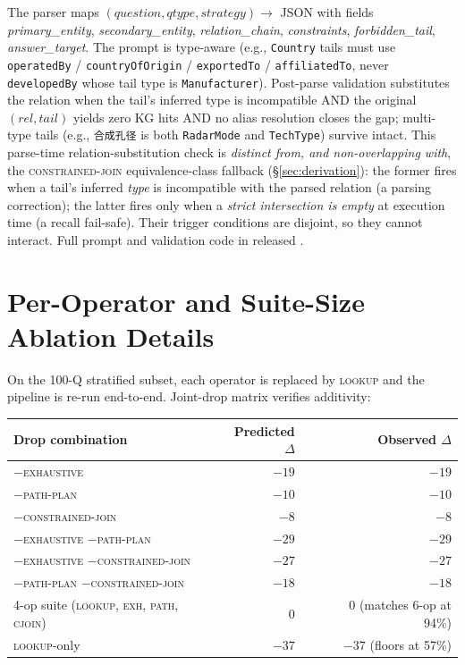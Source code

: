 \documentclass[11pt,a4paper]{article}
\newcommand{\op}[1]{\textsc{\small #1}}
\begin{document}
The parser maps $(\textit{question}, \textit{qtype}, \textit{strategy}) \to$ JSON with fields \textit{primary\_entity}, \textit{secondary\_entity}, \textit{relation\_chain}, \textit{constraints}, \textit{forbidden\_tail}, \textit{answer\_target}. The prompt is type-aware (e.g., \texttt{Country} tails must use \texttt{operatedBy} / \texttt{countryOfOrigin} / \texttt{exportedTo} / \texttt{affiliatedTo}, never \texttt{developedBy} whose tail type is \texttt{Manufacturer}). Post-parse validation substitutes the relation when the tail's inferred type is incompatible AND the original $(rel, tail)$ yields zero KG hits AND no alias resolution closes the gap; multi-type tails (e.g., \texttt{合成孔径} is both \texttt{RadarMode} and \texttt{TechType}) survive intact. This parse-time relation-substitution check is \emph{distinct from, and non-overlapping with}, the \op{constrained-join} equivalence-class fallback (§\ref{sec:derivation}): the former fires when a tail's inferred \emph{type} is incompatible with the parsed relation (a parsing correction); the latter fires only when a \emph{strict intersection is empty} at execution time (a recall fail-safe). Their trigger conditions are disjoint, so they cannot interact. Full prompt and validation code in released .

\section{Per-Operator and Suite-Size Ablation Details}
\label{app:ablation}

On the 100-Q stratified subset, each operator is replaced by \op{lookup} and the pipeline is re-run end-to-end. Joint-drop matrix verifies additivity:

\begin{table}[h]
\centering
\small
\begin{tabular}{l r r}
\toprule
\textbf{Drop combination} & \textbf{Predicted $\Delta$} & \textbf{Observed $\Delta$} \\
\midrule
$-$\op{exhaustive}                                              & $-19$ & $-19$ \\
$-$\op{path-plan}                                               & $-10$ & $-10$ \\
$-$\op{constrained-join}                                        & $-8$  & $-8$  \\
$-$\op{exhaustive} $-$\op{path-plan}                            & $-29$ & $-29$ \\
$-$\op{exhaustive} $-$\op{constrained-join}                     & $-27$ & $-27$ \\
$-$\op{path-plan} $-$\op{constrained-join}                      & $-18$ & $-18$ \\
4-op suite (\op{lookup}, \op{exh}, \op{path}, \op{cjoin})       & $\phantom{-}0$ & $\phantom{-}0$ (matches 6-op at 94\%) \\
\op{lookup}-only                                                & $-37$ & $-37$ (floors at 57\%) \\
\bottomrule
\end{tabular}
\end{table}
\end{document}
